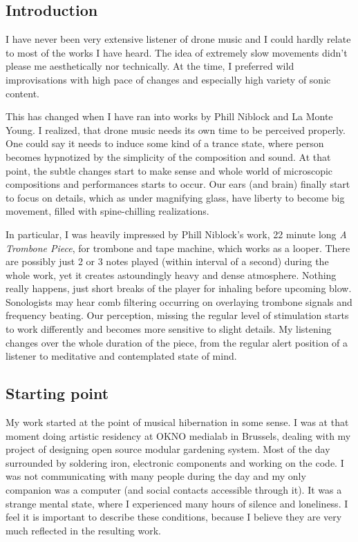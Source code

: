 \documentclass[12pt,a4paper,oneside]{report}
\begin{document}
\subsection{Introduction} I have never been very extensive listener of drone music and I could hardly relate to most of the works I have heard. The idea of extremely slow movements didn't please me aesthetically nor technically. At the time, I preferred wild improvisations with high pace of changes and especially high variety of sonic content.

This has changed when I have ran into works by Phill Niblock and La Monte Young. I realized, that drone music needs its own time to be perceived properly. One could say it needs to induce some kind of a trance state, where person becomes hypnotized by the simplicity of the composition and sound. At that point, the subtle changes start to make sense and whole world of microscopic compositions and performances starts to occur. Our ears (and brain) finally start to focus on details, which as under magnifying glass, have liberty to become big movement, filled with spine-chilling realizations.

In particular, I was heavily impressed by Phill Niblock's work, 22 minute long \emph{A Trombone Piece}, for trombone and tape machine, which works as a looper. There are possibly just 2 or 3 notes played (within interval of a second) during the whole work, yet it creates astoundingly heavy and dense atmosphere. Nothing really happens, just short breaks of the player for inhaling before upcoming blow. Sonologists may hear comb filtering occurring on overlaying trombone signals and frequency beating. Our perception, missing the regular level of stimulation starts to work differently and becomes more sensitive to slight details. My listening changes over the whole duration of the piece, from the regular alert position of a listener to meditative and contemplated state of mind. 

\subsection{Starting point} My work started at the point of musical hibernation in some sense. I was at that moment doing artistic residency at OKNO medialab in Brussels, dealing with my project of designing open source modular gardening system. Most of the day surrounded by soldering iron, electronic components and working on the code. I was not communicating with many people during the day and my only companion was a computer (and social contacts accessible through it). It was a strange mental state, where I experienced many hours of silence and loneliness. I feel it is important to describe these conditions, because I believe they are very much reflected in the resulting work. 
\end{document}
